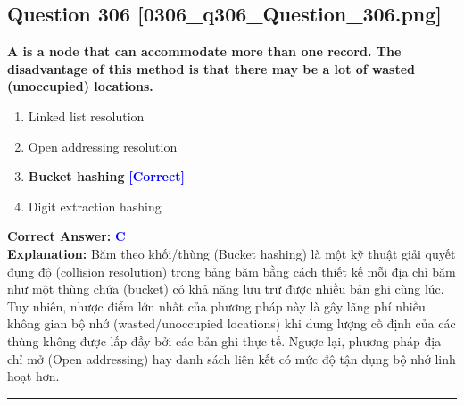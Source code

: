 \documentclass[11pt,a4paper]{article}
\begin{document}
\begin{minipage}{\textwidth}
\subsection*{Question 306 \quad \footnotesize{[0306\_q306\_Question\_306.png]}}
\noindent \textbf{A is a node that can accommodate more than one record. The disadvantage of this method is that there may be a lot of wasted (unoccupied) locations.}

\begin{enumerate}[label=\Alph*.]
    \item Linked list resolution
    \item Open addressing resolution
    \item \textbf{Bucket hashing} \hfill \textcolor{blue}{\textbf{[Correct]}}
    \item Digit extraction hashing
\end{enumerate}

\noindent \textbf{Correct Answer:} \textcolor{blue}{\textbf{C}} \\[2pt]
\noindent \textbf{Explanation:} Băm theo khối/thùng (Bucket hashing) là một kỹ thuật giải quyết đụng độ (collision resolution) trong bảng băm bằng cách thiết kế mỗi địa chỉ băm như một thùng chứa (bucket) có khả năng lưu trữ được nhiều bản ghi cùng lúc. Tuy nhiên, nhược điểm lớn nhất của phương pháp này là gây lãng phí nhiều không gian bộ nhớ (wasted/unoccupied locations) khi dung lượng cố định của các thùng không được lấp đầy bởi các bản ghi thực tế. Ngược lại, phương pháp địa chỉ mở (Open addressing) hay danh sách liên kết có mức độ tận dụng bộ nhớ linh hoạt hơn.

\par\vspace{0.3cm}
\hrule
\vspace{0.3cm}
\end{minipage}
\end{document}
